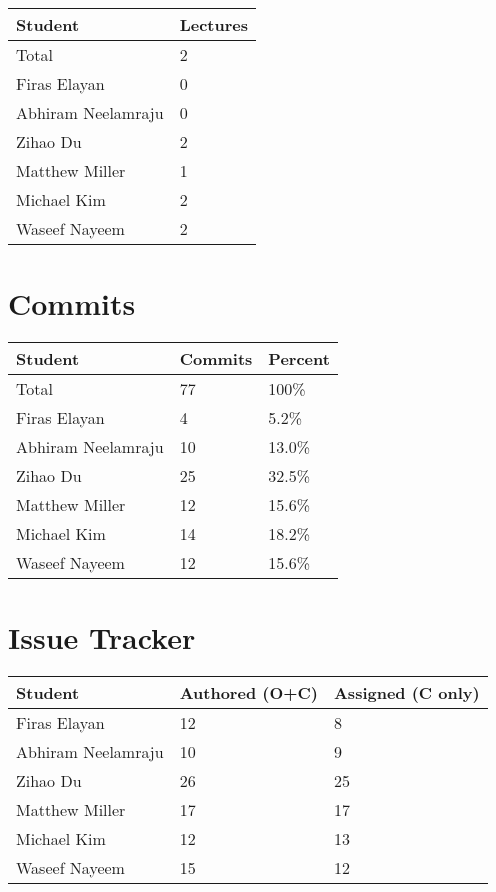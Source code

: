 \documentclass{article}
\begin{document}
\begin{table}[H]
\centering
\begin{tabular}{ll}
\toprule
\textbf{Student} & \textbf{Lectures}\\
\midrule
Total & 2\\
Firas Elayan & 0\\
Abhiram Neelamraju & 0\\
Zihao Du & 2\\
Matthew Miller & 1\\
Michael Kim & 2\\
Waseef Nayeem & 2\\
\bottomrule
\end{tabular}
\end{table}

\section{Commits}

\begin{table}[H]
\centering
\begin{tabular}{lll}
\toprule
\textbf{Student} & \textbf{Commits} & \textbf{Percent}\\
\midrule
Total & 77 & 100\% \\
Firas Elayan & 4 & 5.2\%\\
Abhiram Neelamraju & 10 & 13.0\%\\
Zihao Du & 25& 32.5\%\\
Matthew Miller & 12 & 15.6\%\\
Michael Kim & 14& 18.2\%\\
Waseef Nayeem & 12 & 15.6\%\\
\bottomrule
\end{tabular}
\end{table}

\section{Issue Tracker}
\begin{table}[H]
\centering
\begin{tabular}{lll}
\toprule
\textbf{Student} & \textbf{Authored (O+C)} & \textbf{Assigned (C only)}\\
\midrule
Firas Elayan & 12 & 8\\
Abhiram Neelamraju & 10 & 9\\
Zihao Du & 26 & 25\\
Matthew Miller & 17 & 17\\
Michael Kim & 12 & 13\\
Waseef Nayeem & 15 & 12\\
\bottomrule
\end{tabular}
\end{table}
\end{document}
